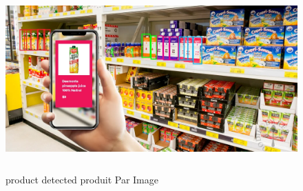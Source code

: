 \documentclass[12pt,a4paper,article]{memoir} %
\begin{document}
		\begin{figure}[h!]
			\centering
			\includegraphics[width=150mm,height=70mm]{productdetect}
			\caption{product detected produit Par Image}
			\label{fig:product detected produit Par Image}
		\end{figure}

 
\end{document}
